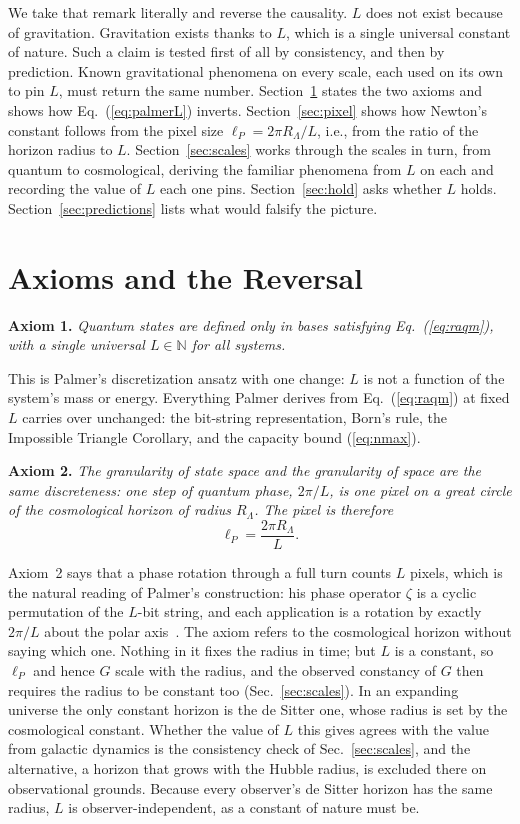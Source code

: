 \documentclass[aps,prd,twocolumn,superscriptaddress,nofootinbib,showkeys]{revtex4-2}
\begin{document}
We take that remark literally and reverse the causality. $L$ does not exist because of gravitation. Gravitation exists thanks to $L$, which is a single universal constant of nature. Such a claim is tested first of all by consistency, and then by prediction. Known gravitational phenomena on every scale, each used on its own to pin $L$, must return the same number. Section~\ref{sec:axioms} states the two axioms and shows how Eq.~(\ref{eq:palmerL}) inverts. Section~\ref{sec:pixel} shows how Newton's constant follows from the pixel size $\ell_P = 2\pi R_\Lambda/L$, i.e., from the ratio of the horizon radius to $L$. Section~\ref{sec:scales} works through the scales in turn, from quantum to cosmological, deriving the familiar phenomena from $L$ on each and recording the value of $L$ each one pins. Section~\ref{sec:hold} asks whether $L$ holds. Section~\ref{sec:predictions} lists what would falsify the picture.

\section{Axioms and the Reversal}
\label{sec:axioms}

\textbf{Axiom 1.} \emph{Quantum states are defined only in bases satisfying Eq.~(\ref{eq:raqm}), with a single universal $L\in\mathbb{N}$ for all systems.}

This is Palmer's discretization ansatz with one change: $L$ is not a function of the system's mass or energy. Everything Palmer derives from Eq.~(\ref{eq:raqm}) at fixed $L$ carries over unchanged: the bit-string representation, Born's rule, the Impossible Triangle Corollary, and the capacity bound (\ref{eq:nmax}).

\textbf{Axiom 2.} \emph{The granularity of state space and the granularity of space are the same discreteness: one step of quantum phase, $2\pi/L$, is one pixel on a great circle of the cosmological horizon of radius $R_\Lambda$. The pixel is therefore}
\begin{equation}
\ell_P = \frac{2\pi R_\Lambda}{L} .
\label{eq:ident}
\end{equation}

Axiom~2 says that a phase rotation through a full turn counts $L$ pixels, which is the natural reading of Palmer's construction: his phase operator $\zeta$ is a cyclic permutation of the $L$-bit string, and each application is a rotation by exactly $2\pi/L$ about the polar axis~\cite{palmer2026}. The axiom refers to the cosmological horizon without saying which one. Nothing in it fixes the radius in time; but $L$ is a constant, so $\ell_P$ and hence $G$ scale with the radius, and the observed constancy of $G$ then requires the radius to be constant too (Sec.~\ref{sec:scales}). In an expanding universe the only constant horizon is the de Sitter one, whose radius is set by the cosmological constant. Whether the value of $L$ this gives agrees with the value from galactic dynamics is the consistency check of Sec.~\ref{sec:scales}, and the alternative, a horizon that grows with the Hubble radius, is excluded there on observational grounds. Because every observer's de Sitter horizon has the same radius, $L$ is observer-independent, as a constant of nature must be.
\end{document}
